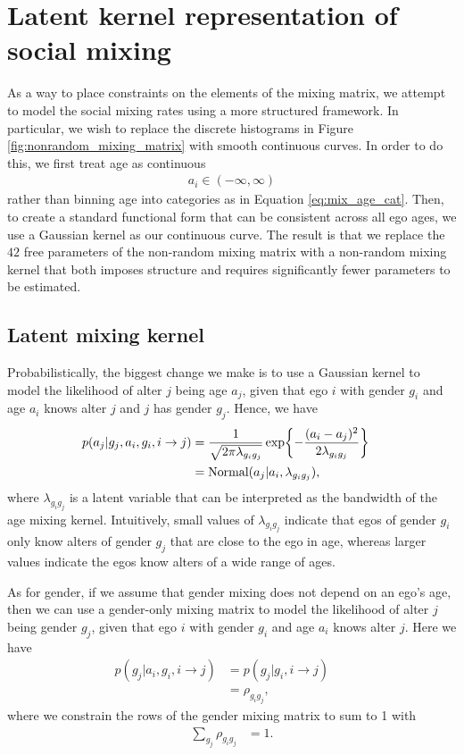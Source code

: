\section{Latent kernel representation of social mixing}
\label{sec:kernel_derivation}

As a way to place constraints on the elements of the mixing matrix, we attempt to model the social mixing rates using a more structured framework. In particular, we wish to replace the discrete histograms in Figure \ref{fig:nonrandom_mixing_matrix} with smooth continuous curves. In order to do this, we first treat age as continuous 
\begin{align}
a_i \in (-\infty,\infty)
\end{align}
rather than binning age into categories as in Equation \ref{eq:mix_age_cat}. Then, to create a standard functional form that can be consistent across all ego ages, we use a Gaussian kernel as our continuous curve. The result is that we replace the $42$ free parameters of the non-random mixing matrix with a non-random mixing kernel that both imposes structure and requires significantly fewer parameters to be estimated.

\subsection{Latent mixing kernel}
\label{subsec:nonrandom_mixing_kernel}

Probabilistically, the biggest change we make is to use a Gaussian kernel to model the likelihood of alter $j$ being age $a_j$, given that ego $i$ with gender $g_i$ and age $a_i$ knows alter $j$ and $j$ has gender $g_j$. Hence, we have
\begin{align}
p(a_j | g_j, a_i, g_i, i \to j) 
&= \frac{ 1 }{ \sqrt{ 2\pi\lambda_{g_ig_j} } } \exp\biggl\{ -\frac{ (a_i - a_j)^2 }{ 2\lambda_{g_ig_j} } \biggr\} && \\\nonumber
&= \text{Normal}(a_j | a_i, \lambda_{g_ig_j}),
\end{align}
where $\lambda_{g_ig_j}$ is a latent variable that can be interpreted as the bandwidth of the age mixing kernel. Intuitively, small values of $\lambda_{g_ig_j}$ indicate that egos of gender $g_i$ only know alters of gender $g_j$ that are close to the ego in age, whereas larger values indicate the egos know alters of a wide range of ages. 

As for gender, if we assume that gender mixing does not depend on an ego's age, then we can use a gender-only mixing matrix to model the likelihood of alter $j$ being gender $g_j$, given that ego $i$ with gender $g_i$ and age $a_i$ knows alter $j$. Here we have
\begin{align}
p(g_j | a_i, g_i, i \to j) 
&= p(g_j | g_i, i \to j) && \\\nonumber
&= \rho_{g_ig_j},
\end{align}
where we constrain the rows of the gender mixing matrix to sum to 1 with
\begin{align}
\sum_{g_j} \rho_{g_ig_j} &= 1.
\end{align}

